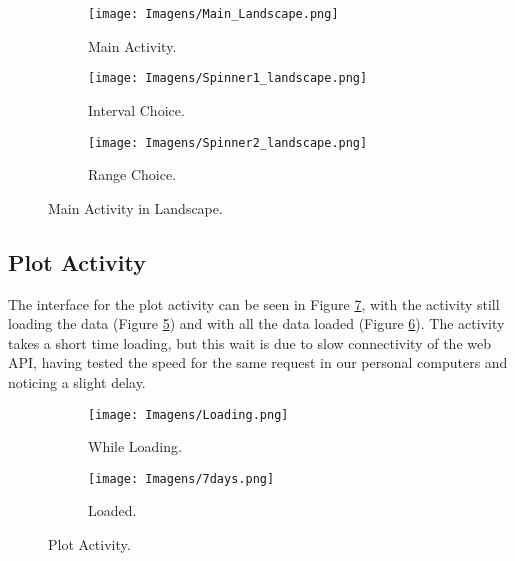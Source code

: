 \documentclass{article}
\begin{document}
\begin{figure}[ht]
    \centering
    \begin{subfigure}[t]{0.8\textwidth} 
        \centering
        \texttt{[image: Imagens/Main\_Landscape.png]}
        \caption{Main Activity.}
        \label{fig:mainactivity_l}
    \end{subfigure}

    \vspace{1em} 

    \begin{subfigure}[t]{0.8\textwidth}
        \centering
        \texttt{[image: Imagens/Spinner1\_landscape.png]}
        \caption{Interval Choice.}
        \label{fig:spinner1_l}
    \end{subfigure}

    \vspace{1em} 

    \begin{subfigure}[t]{0.8\textwidth}
        \centering
        \texttt{[image: Imagens/Spinner2\_landscape.png]}
        \caption{Range Choice.}
        \label{fig:spinner2_l}
    \end{subfigure}

    \caption{Main Activity in Landscape.}
    \label{fig:whole_main_activity}
\end{figure}

\subsection{Plot Activity}
The interface for the plot activity can be seen in Figure \ref{fig:plot activity}, with the activity still loading the data (Figure \ref{fig:loading}) and with all the data loaded (Figure \ref{fig:plot loaded}).
The activity takes a short time loading, but this wait is due to slow connectivity of the web API, having tested the speed for the same request in our personal computers and noticing a slight delay.

\begin{figure}[ht]
    \centering
    
    \begin{subfigure}[t]{0.49\textwidth}
        \centering
        \texttt{[image: Imagens/Loading.png]}
        \caption{While Loading.}
        \label{fig:loading}
    \end{subfigure}
    \hfill
    \begin{subfigure}[t]{0.49\textwidth}
        \centering
        \texttt{[image: Imagens/7days.png]}
        \caption{Loaded.}
        \label{fig:plot loaded}
    \end{subfigure}

    \caption{Plot Activity.}
    \label{fig:plot activity}
\end{figure}
\end{document}
